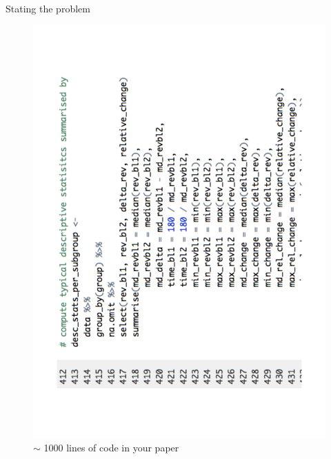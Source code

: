 \documentclass[final,hyperref={pdfpagelabels=false}]{beamer}
\begin{document}
\begin{frame}{}
\begin{columns}[t]
\begin{column}{.48\linewidth}
      
         \begin{block}{Stating the problem}
         \begin{minipage}[t]{0.40\textwidth}
         \begin{figure}[ht]
             \centering
             \includegraphics[valign=T,scale=.3, angle=270]{logo/rcode_example}
             \caption{$\sim$ 1000 lines of code in your paper} 
          \end{figure}
          \end{minipage}
          \begin{minipage}[t]{0.55\textwidth}
          \begin{figure}[ht]
             \centering

\end{figure}
\end{minipage}
\end{block}
\end{column}
\end{columns}
\end{frame}
\end{document}
